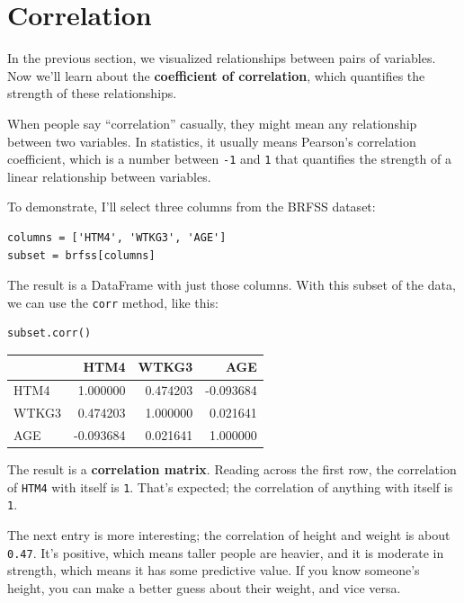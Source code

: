 \hypertarget{correlation}{%
\section{Correlation}\label{correlation}}

In the previous section, we visualized relationships between pairs of
variables. Now we'll learn about the \textbf{coefficient of
correlation}, which quantifies the strength of these relationships.

When people say ``correlation'' casually, they might mean any
relationship between two variables. In statistics, it usually means
Pearson's correlation coefficient, which is a number between
\passthrough{\lstinline!-1!} and \passthrough{\lstinline!1!} that
quantifies the strength of a linear relationship between variables.

To demonstrate, I'll select three columns from the BRFSS dataset:

\begin{lstlisting}[]
columns = ['HTM4', 'WTKG3', 'AGE']
subset = brfss[columns]
\end{lstlisting}

The result is a DataFrame with just those columns. With this subset of
the data, we can use the \passthrough{\lstinline!corr!} method, like
this:

\begin{lstlisting}[]
subset.corr()
\end{lstlisting}

\begin{tabular}{lrrr}
\midrule
{} &      HTM4 &     WTKG3 &       AGE \\
\midrule
HTM4  &  1.000000 &  0.474203 & -0.093684 \\
WTKG3 &  0.474203 &  1.000000 &  0.021641 \\
AGE   & -0.093684 &  0.021641 &  1.000000 \\
\midrule
\end{tabular}

The result is a \textbf{correlation matrix}. Reading across the first
row, the correlation of \passthrough{\lstinline!HTM4!} with itself is
\passthrough{\lstinline!1!}. That's expected; the correlation of
anything with itself is \passthrough{\lstinline!1!}.

The next entry is more interesting; the correlation of height and weight
is about \passthrough{\lstinline!0.47!}. It's positive, which means
taller people are heavier, and it is moderate in strength, which means
it has some predictive value. If you know someone's height, you can make
a better guess about their weight, and vice versa.

